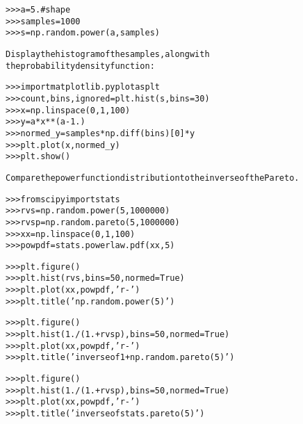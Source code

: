 \begin{boxedminipage}{\funcwidth}
\begin{alltt}
{\textgreater}{\textgreater}{\textgreater} a = 5. \# shape
{\textgreater}{\textgreater}{\textgreater} samples = 1000
{\textgreater}{\textgreater}{\textgreater} s = np.random.power(a, samples)

Display the histogram of the samples, along with
the probability density function:

{\textgreater}{\textgreater}{\textgreater} import matplotlib.pyplot as plt
{\textgreater}{\textgreater}{\textgreater} count, bins, ignored = plt.hist(s, bins=30)
{\textgreater}{\textgreater}{\textgreater} x = np.linspace(0, 1, 100)
{\textgreater}{\textgreater}{\textgreater} y = a*x**(a-1.)
{\textgreater}{\textgreater}{\textgreater} normed\_y = samples*np.diff(bins)[0]*y
{\textgreater}{\textgreater}{\textgreater} plt.plot(x, normed\_y)
{\textgreater}{\textgreater}{\textgreater} plt.show()

Compare the power function distribution to the inverse of the Pareto.

{\textgreater}{\textgreater}{\textgreater} from scipy import stats
{\textgreater}{\textgreater}{\textgreater} rvs = np.random.power(5, 1000000)
{\textgreater}{\textgreater}{\textgreater} rvsp = np.random.pareto(5, 1000000)
{\textgreater}{\textgreater}{\textgreater} xx = np.linspace(0,1,100)
{\textgreater}{\textgreater}{\textgreater} powpdf = stats.powerlaw.pdf(xx,5)

{\textgreater}{\textgreater}{\textgreater} plt.figure()
{\textgreater}{\textgreater}{\textgreater} plt.hist(rvs, bins=50, normed=True)
{\textgreater}{\textgreater}{\textgreater} plt.plot(xx,powpdf,'r-')
{\textgreater}{\textgreater}{\textgreater} plt.title('np.random.power(5)')

{\textgreater}{\textgreater}{\textgreater} plt.figure()
{\textgreater}{\textgreater}{\textgreater} plt.hist(1./(1.+rvsp), bins=50, normed=True)
{\textgreater}{\textgreater}{\textgreater} plt.plot(xx,powpdf,'r-')
{\textgreater}{\textgreater}{\textgreater} plt.title('inverse of 1 + np.random.pareto(5)')

{\textgreater}{\textgreater}{\textgreater} plt.figure()
{\textgreater}{\textgreater}{\textgreater} plt.hist(1./(1.+rvsp), bins=50, normed=True)
{\textgreater}{\textgreater}{\textgreater} plt.plot(xx,powpdf,'r-')
{\textgreater}{\textgreater}{\textgreater} plt.title('inverse of stats.pareto(5)')
\end{alltt}

\setlength{\parskip}{1ex}
    \end{boxedminipage}

    \label{QSTK:qstklearn:mldiagnostics:rand}

